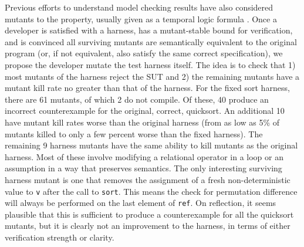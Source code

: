 \documentclass{svjour3}
\begin{document}
Previous efforts to understand model checking results have also
considered mutants to the property, usually given as a temporal logic
formula \cite{MutSpec}.  Once a developer is satisfied with a harness,
has a mutant-stable bound for verification, and is convinced all
surviving mutants are semantically equivalent to the original program
(or, if not equivalent, also satisfy the same correct specification),
we propose the developer mutate the test harness itself.  The
idea is to check that 1) most mutants of the harness reject the SUT
and 2) the remaining mutants have a mutant kill rate no greater than
that of the harness.  For the fixed sort harness, there are 61 mutants, of
which 2 do not compile.  Of these, 40 produce an incorrect
counterexample for the original, correct, quicksort.  An additional
10 have mutant kill rates worse than the original harness (from
as low as 5\% of mutants killed to only a few percent worse than the
fixed harness).  The remaining 9 harness mutants have the same ability to kill
mutants as the original harness.  Most of these involve modifying a
relational operator in a loop or an assumption in a way that preserves
semantics.  The only interesting surviving
harness mutant is one that removes the assignment of a fresh
non-deterministic value to {\tt v} after the call to {\tt sort}.  This
means the check for permutation difference will always be performed on
the last element of {\tt ref}.  On reflection, it seems plausible
that this is sufficient to produce a counterexample for all the quicksort mutants, but it is clearly not an improvement to the harness, in
terms of either verification strength or clarity.
\end{document}
